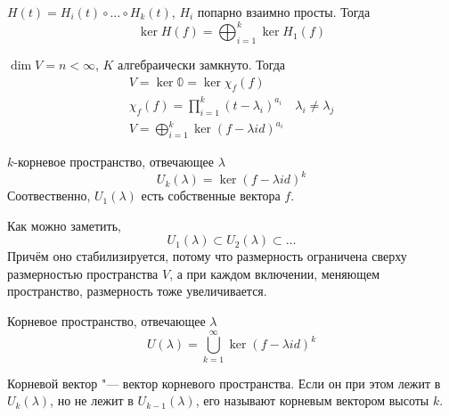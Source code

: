 \begin{conseq}
	$H(t) = H_i(t) \circ \dots \circ H_k(t)$, $H_i$ попарно взаимно просты.
	Тогда
	\[ \ker H(f) = \bigoplus_{i=1}^k \ker H_1(f) \]
\end{conseq}

$\dim V = n < \infty$, $K$ алгебраически замкнуто.
Тогда
\begin{gather*}
	V = \ker \mathbb{0} = \ker \chi_f(f) \\
	\chi_f(f) = \prod_{i=1}^k (t-\lambda_i)^{a_i} \quad \lambda_i \ne \lambda_j \\
	V = \bigoplus_{i=1}^k \ker (f - \lambda id)^{a_i}
\end{gather*}

\begin{Def}
	$k$-корневое пространство, отвечающее $\lambda$
	\[ U_k(\lambda) = \ker (f - \lambda id)^k \]
	Соотвественно, $U_1(\lambda)$ есть собственные вектора $f$.
\end{Def}

Как можно заметить,
\[ U_1(\lambda) \subset U_2(\lambda) \subset \dots \]
Причём оно стабилизируется, потому что размерность ограничена сверху размерностью пространства $V$, а при каждом включении, меняющем пространство, размерность тоже увеличивается.
\begin{Def}
	Корневое пространство, отвечающее $\lambda$
	\[ U(\lambda) = \bigcup_{k=1}^\infty \ker (f - \lambda id)^k \]
\end{Def}

\begin{Def}
	Корневой вектор "--- вектор корневого пространства.
	Если он при этом лежит в $U_{k}(\lambda)$, но не лежит в $U_{k-1}(\lambda)$, его называют корневым вектором высоты $k$.
\end{Def}
